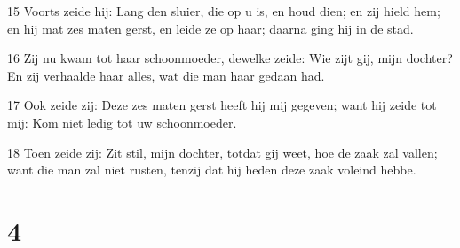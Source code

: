 \par 15 Voorts zeide hij: Lang den sluier, die op u is, en houd dien; en zij hield hem; en hij mat zes maten gerst, en leide ze op haar; daarna ging hij in de stad.
\par 16 Zij nu kwam tot haar schoonmoeder, dewelke zeide: Wie zijt gij, mijn dochter? En zij verhaalde haar alles, wat die man haar gedaan had.
\par 17 Ook zeide zij: Deze zes maten gerst heeft hij mij gegeven; want hij zeide tot mij: Kom niet ledig tot uw schoonmoeder.
\par 18 Toen zeide zij: Zit stil, mijn dochter, totdat gij weet, hoe de zaak zal vallen; want die man zal niet rusten, tenzij dat hij heden deze zaak voleind hebbe.

\chapter{4}

